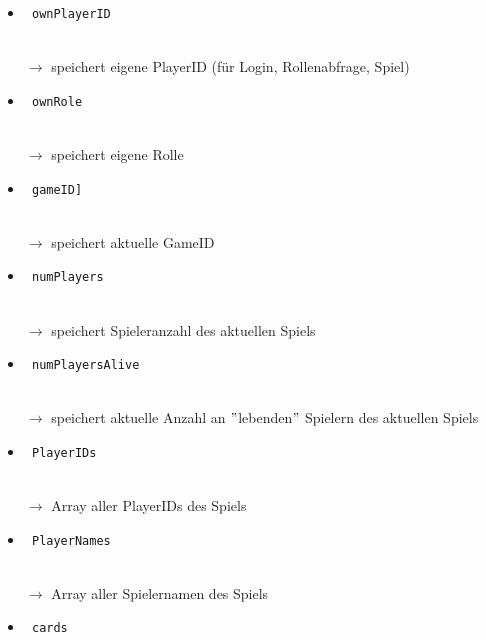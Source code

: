 \documentclass[12pt, a4paper]{article}
\begin{document}
\begin{itemize}

\item \begin{verbatim} ownPlayerID 
\end{verbatim} \\
\vspace{-0.2 cm}
$\rightarrow$ speichert eigene PlayerID (für Login, Rollenabfrage, Spiel)
\item \begin{verbatim} ownRole 
\end{verbatim} \\
\vspace{-0.2 cm}
$\rightarrow$ speichert eigene Rolle
\item\begin{verbatim} gameID]
\end{verbatim} \\
\vspace{-0.2 cm}
$\rightarrow$ speichert aktuelle GameID
\item \begin{verbatim} numPlayers
\end{verbatim} \\
\vspace{-0.2 cm}
$\rightarrow$ speichert Spieleranzahl des aktuellen Spiels
\item \begin{verbatim} numPlayersAlive
\end{verbatim} \\
\vspace{-0.2 cm}
$\rightarrow$ speichert aktuelle Anzahl an $"$lebenden$"$ Spielern des aktuellen Spiels
\item \begin{verbatim} PlayerIDs
\end{verbatim} \\
\vspace{-0.2 cm} 
$\rightarrow$ Array aller PlayerIDs des Spiels
\item \begin{verbatim} PlayerNames
\end{verbatim} \\
\vspace{-0.2 cm}
$\rightarrow$ Array aller Spielernamen des Spiels
\item \begin{verbatim} cards
\end{verbatim} \\
\vspace{-0.2 cm}

\end{itemize}
\end{document}
